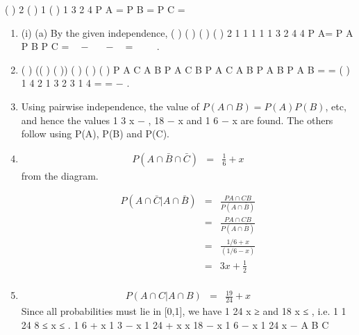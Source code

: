 \documentclass[a4paper,12pt]{article}
\begin{document}
( ) 2 ( ) 1 ( ) 1
3 2 4
P A = P B = P C =
\begin{enumerate}
\item (i) (a) By the given independence,
( ) ( ) ( ) ( ) 2 1 1 1 1 1
3 2 4 4
P A\capB \capC = P A P B P C =  −  −  =
  
.
\item ( ) (( ) ( ))
( )
( )
( )
P A C A B P A C B
P A C A B
P A B P A B
\cap \cap \cap \cap \cap
\cap \cap = =
\cap \cap
( )
1
4
2 1
3 2
3
1 4
= =
−
.
\item 
Using pairwise independence, the value of $P( A\cap B) = P(A)P(B)$, etc, and
hence the values 1
3 x − , 18
− x and 1
6 − x are found. The others follow using
P(A), P(B) and P(C).
\item  
\begin{eqnarray*}
P \left(A\cap \bar{B} \cap \bar{C} \right) &=& \frac{1}{6}+ x
\end{eqnarray*} from the diagram.

\begin{eqnarray*}
P (A\cap \bar{C}| A \cap \bar{B}) &=& \frac{ P A  \cap C B}{P(A\cap \bar{B})} \\
&=& \frac{ P A  \cap C B}{P(A \cap \bar{B})} \\
&=& \frac{1/6 + x }{(1/6-x)} \\
&=& 3x+\frac{1}{2} \\
\end{eqnarray*}

\item 
\begin{eqnarray*}
P (A\cap C| A \cap B) &=& \frac{19}{24} + x
\end{eqnarray*}
Since all probabilities must lie in [0,1], we have 1
24 x ≥ and 18
x ≤ , i.e.
1 1
24 8
≤ x ≤ .
1
6 + x 1
3 − x 1
24 + x
x 18
− x 1
6 − x
1
24 x −
A B
C
\end{enumerate}
\end{document}
